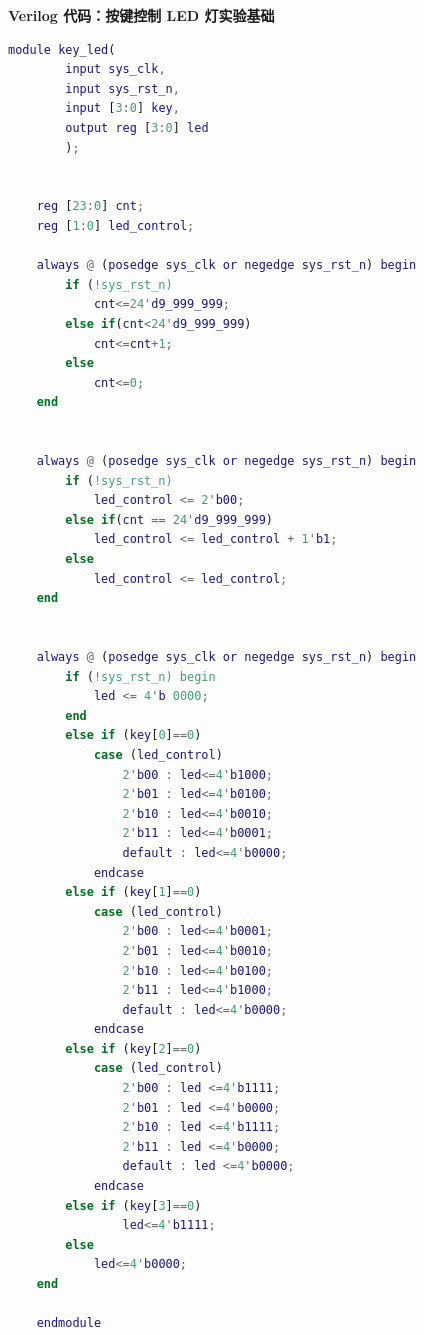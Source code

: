 \documentclass[UTF8]{article}
\theoremstyle{MyLineTheoremStyle} %
\theoremstyle{MyBlockTheoremStyle} %
\theoremstyle{MySubsubsectionStyle} %
\begin{document}
\cleardoublepage

\textbf{Verilog 代码：按键控制 LED 灯实验基础}
\begin{lstlisting}[language=Matlab, style=MatlabStyle_src]
    module key_led(
        input sys_clk,
        input sys_rst_n,
        input [3:0] key,
        output reg [3:0] led
        );
        
        
    reg [23:0] cnt;
    reg [1:0] led_control;
    
    always @ (posedge sys_clk or negedge sys_rst_n) begin
        if (!sys_rst_n)
            cnt<=24'd9_999_999;
        else if(cnt<24'd9_999_999)
            cnt<=cnt+1;
        else
            cnt<=0;
    end
    
    
    always @ (posedge sys_clk or negedge sys_rst_n) begin
        if (!sys_rst_n)
            led_control <= 2'b00;
        else if(cnt == 24'd9_999_999)
            led_control <= led_control + 1'b1;
        else
            led_control <= led_control;
    end
    
    
    always @ (posedge sys_clk or negedge sys_rst_n) begin
        if (!sys_rst_n) begin
            led <= 4'b 0000;
        end
        else if (key[0]==0)
            case (led_control)
                2'b00 : led<=4'b1000;
                2'b01 : led<=4'b0100;
                2'b10 : led<=4'b0010;
                2'b11 : led<=4'b0001;
                default : led<=4'b0000;
            endcase
        else if (key[1]==0)
            case (led_control)
                2'b00 : led<=4'b0001;
                2'b01 : led<=4'b0010;
                2'b10 : led<=4'b0100;
                2'b11 : led<=4'b1000;
                default : led<=4'b0000;
            endcase
        else if (key[2]==0)
            case (led_control)
                2'b00 : led <=4'b1111;
                2'b01 : led <=4'b0000;
                2'b10 : led <=4'b1111;
                2'b11 : led <=4'b0000;
                default : led <=4'b0000;
            endcase
        else if (key[3]==0)
                led<=4'b1111;
        else
            led<=4'b0000;
    end 
    
    endmodule
                
\end{lstlisting}


\cleardoublepage
\end{document}
